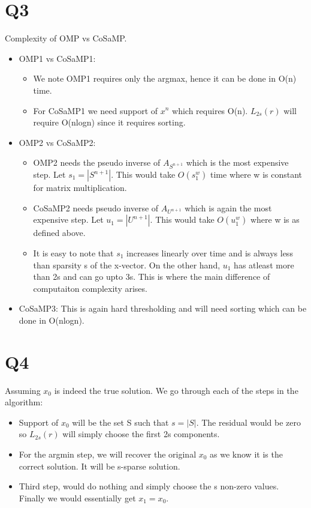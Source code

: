 \documentclass{article}
\begin{document}
\section{Q3}
Complexity of OMP vs CoSaMP.
\begin{itemize}
\item OMP1 vs CoSaMP1:
  \begin{itemize}
  \item We note OMP1 requires only the argmax, hence it can be done in O(n) time.
  \item For CoSaMP1 we need support of $x^{n}$ which requires O(n). $L_{2s}(r)$ will require O(nlogn) since it requires sorting.
  \end{itemize}
\item OMP2 vs CoSaMP2:
  \begin{itemize}
  \item OMP2 needs the pseudo inverse of $A_{S^{n+1}}$ which is the most expensive step. Let $s_1 = |S^{n+1}|$. This would take $O(s_1^w)$ time where w is constant for matrix multiplication.
  \item CoSaMP2 needs pseudo inverse of $A_{U^{n+1}}$ which is again the most expensive step. Let $u_1 = |U^{n+1}|$. This would take $O(u_1^w)$ where w is as defined above.
  \item It is easy to note that $s_1$ increases linearly over time and is always less than sparsity s of the x-vector. On the other hand, $u_1$ has atleast more than 2s and can go upto 3s. This is where the main difference of computaiton complexity arises.
  \end{itemize}
\item CoSaMP3: This is again hard thresholding and will need sorting which can be done in O(nlogn).
\end{itemize}

\section{Q4}
Assuming $x_0$ is indeed the true solution. We go through each of the steps in the algorithm:
\begin{itemize}
\item Support of $x_0$ will be the set S such that $s = |S|$. The residual would be zero so $L_{2s}(r)$ will simply choose the first 2s components.
\item For the argmin step, we will recover the original $x_0$ as we know it is the correct solution. It will be s-sparse solution.
\item Third step, would do nothing and simply choose the s non-zero values. Finally we would essentially get $x_1 = x_0$.
\end{itemize}
\end{document}
